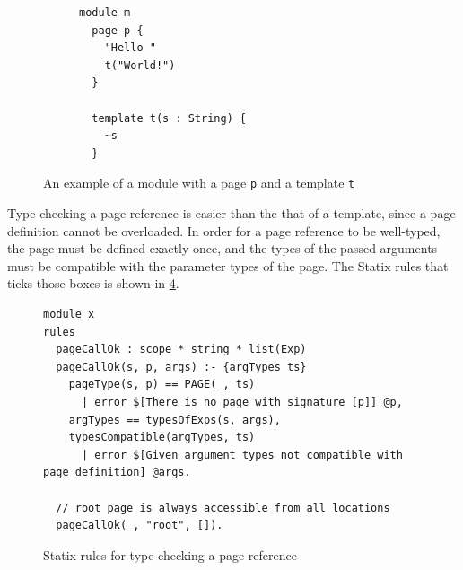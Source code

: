       \begin{figure}
        \begin{subfigure}[b]{0.3\textwidth}
          \begin{verbatim}
module m
  page p {
    "Hello "
    t("World!")
  }

  template t(s : String) {
    ~s
  }
          \end{verbatim}
          \caption{\label{fig:webdsl-page-and-template-decl-webdsl}}
        \end{subfigure}
        \begin{subfigure}[b]{0.7\textwidth}
          \centering
          \caption{\label{fig:webdsl-page-and-template-decl-sg}}
        \end{subfigure}
        \caption{\label{fig:webdsl-page-and-template-decl}An example of a module with a page \texttt{p} and a template \texttt{t}}
      \end{figure}

      Type-checking a page reference is easier than the that of a template, since a page definition cannot be overloaded. In order for a page reference to be well-typed, the page must be defined exactly once, and the types of the passed arguments must be compatible with the parameter types of the page. The Statix rules that ticks those boxes is shown in \cref{fig:webdsl-page-type-checking}.

      \begin{figure}
        \begin{verbatim}
module x
rules
  pageCallOk : scope * string * list(Exp)
  pageCallOk(s, p, args) :- {argTypes ts}
    pageType(s, p) == PAGE(_, ts)
      | error $[There is no page with signature [p]] @p,
    argTypes == typesOfExps(s, args),
    typesCompatible(argTypes, ts)
      | error $[Given argument types not compatible with page definition] @args.
    
  // root page is always accessible from all locations
  pageCallOk(_, "root", []).
        \end{verbatim}
        \caption{\label{fig:webdsl-page-type-checking}Statix rules for type-checking a page reference}
      \end{figure}

